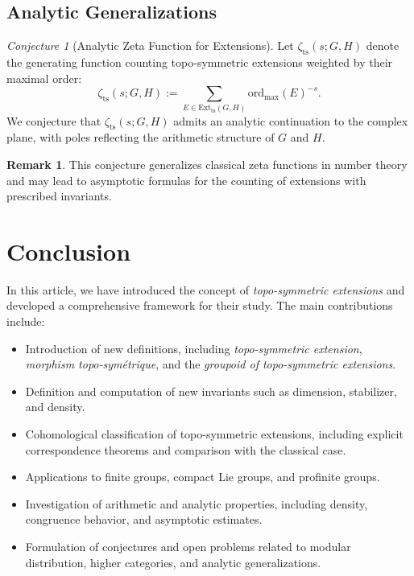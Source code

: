 \documentclass[11pt,a4paper]{article}
\theoremstyle{plain}
\theoremstyle{definition}
\newtheorem{remark}[theorem]{Remark}
\theoremstyle{remark}
\newtheorem{conjecture}[theorem]{Conjecture}
\begin{document}
	\subsection{Analytic Generalizations}
	
	\begin{conjecture}[Analytic Zeta Function for Extensions]
		Let $\zeta_{\mathrm{ts}}(s;G,H)$ denote the generating function counting topo-symmetric extensions weighted by their maximal order:
		\[
		\zeta_{\mathrm{ts}}(s;G,H) := \sum_{E \in \mathrm{Ext}_{\mathrm{ts}}(G,H)} \mathrm{ord}_{\max}(E)^{-s}.
		\]
		We conjecture that $\zeta_{\mathrm{ts}}(s;G,H)$ admits an analytic continuation to the complex plane, with poles reflecting the arithmetic structure of $G$ and $H$.
	\end{conjecture}
	
	\begin{remark}
		This conjecture generalizes classical zeta functions in number theory and may lead to asymptotic formulas for the counting of extensions with prescribed invariants.
	\end{remark}
	\section{Conclusion}
	
	In this article, we have introduced the concept of \emph{topo-symmetric extensions} and developed a comprehensive framework for their study. The main contributions include:
	
	\begin{itemize}
		\item Introduction of new definitions, including \emph{topo-symmetric extension}, \emph{morphism topo-symétrique}, and the \emph{groupoid of topo-symmetric extensions}.
		\item Definition and computation of new invariants such as dimension, stabilizer, and density.
		\item Cohomological classification of topo-symmetric extensions, including explicit correspondence theorems and comparison with the classical case.
		\item Applications to finite groups, compact Lie groups, and profinite groups.
		\item Investigation of arithmetic and analytic properties, including density, congruence behavior, and asymptotic estimates.
		\item Formulation of conjectures and open problems related to modular distribution, higher categories, and analytic generalizations.
	\end{itemize}
	
\end{document}
